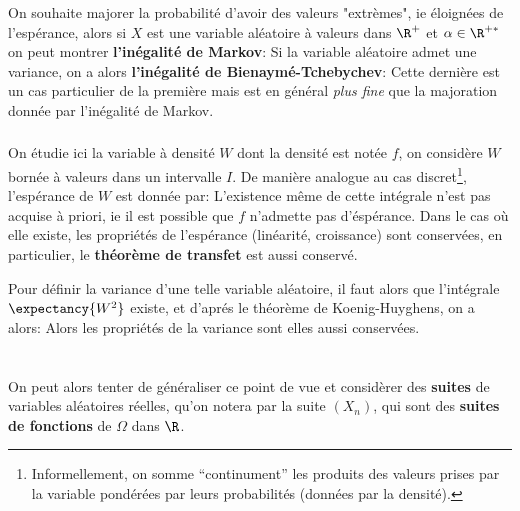 \subsection*{}
On souhaite majorer la probabilité d'avoir des valeurs "extrèmes", ie éloignées de l'espérance, alors si \(X\) est une variable aléatoire à valeurs dans \(\R^+\) et \(\alpha \in \R^{+*}\) on peut montrer \textbf{l'inégalité de Markov}:
Si la variable aléatoire admet une variance, on a alors \textbf{l'inégalité de Bienaymé-Tchebychev}:
Cette dernière est un cas particulier de la première mais est en général \textit{plus fine} que la majoration donnée par l'inégalité de Markov.


\subsection*{}
On étudie ici la variable à densité \(W\) dont la densité est notée \(f\), on considère \(W\) bornée à valeurs dans un intervalle \(I\).\+
De manière analogue au cas discret\footnote[2]{Informellement, on somme ``continument'' les produits des valeurs prises par la variable pondérées par leurs probabilités (données par la densité).}, l'espérance de \(W\) est donnée par:
L'existence même de cette intégrale n'est pas acquise à priori, ie il est possible que \(f\) n'admette pas d'éspérance.
Dans le cas où elle existe, les propriétés de l'espérance (linéarité, croissance) sont conservées, en particulier, le \textbf{théorème de transfet} est aussi conservé.\<

Pour définir la variance d'une telle variable aléatoire, il faut alors que l'intégrale \(\expectancy{W^2}\) existe, et d'aprés le théorème de Koenig-Huyghens, on a alors: 
Alors les propriétés de la variance sont elles aussi conservées.

\chapter*{} %
On peut alors tenter de généraliser ce point de vue et considèrer des \textbf{suites} de variables aléatoires réelles, qu'on notera par la suite \((X_n)\), qui sont des \textbf{suites de fonctions} de \(\Omega\) dans \(\R\).\<


